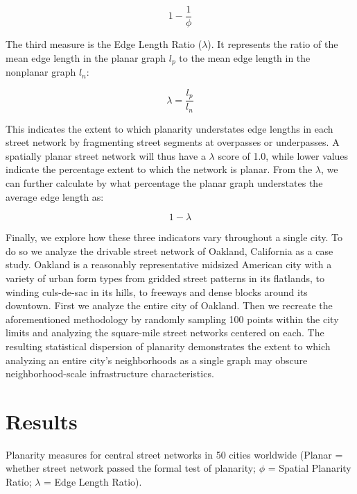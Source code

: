 \documentclass[Afour,sageh,times]{sagej}
\begin{document}
\begin{equation}
	\label{eq:spr_overstates}
	1 - \frac{1}{\phi}
\end{equation}

The third measure is the Edge Length Ratio ($\lambda$). It represents the ratio of the mean edge length in the planar graph $l_p$ to the mean edge length in the nonplanar graph $l_n$:

\begin{equation}
	\label{eq:elr}
	\lambda = \frac{l_p}{l_n}
\end{equation}

This indicates the extent to which planarity understates edge lengths in each street network by fragmenting street segments at overpasses or underpasses. A spatially planar street network will thus have a $\lambda$ score of 1.0, while lower values indicate the percentage extent to which the network is planar. From the $\lambda$, we can further calculate by what percentage the planar graph understates the average edge length as:

\begin{equation}
	\label{eq:elr_understates}
	1 - \lambda
\end{equation}

Finally, we explore how these three indicators vary throughout a single city. To do so we analyze the drivable street network of Oakland, California as a case study. Oakland is a reasonably representative midsized American city with a variety of urban form types from gridded street patterns in its flatlands, to winding culs-de-sac in its hills, to freeways and dense blocks around its downtown. First we analyze the entire city of Oakland. Then we recreate the aforementioned methodology by randomly sampling 100 points within the city limits and analyzing the square-mile street networks centered on each. The resulting statistical dispersion of planarity demonstrates the extent to which analyzing an entire city's neighborhoods as a single graph may obscure neighborhood-scale infrastructure characteristics.



\section{Results}

\begin{table}[htbp]
	\centering
	\caption{Planarity measures for central street networks in 50 cities worldwide (Planar = whether street network passed the formal test of planarity; $\phi$ = Spatial Planarity Ratio; $\lambda$ = Edge Length Ratio).}
	\label{tab:world_cities}
	
\end{table}
\end{document}
